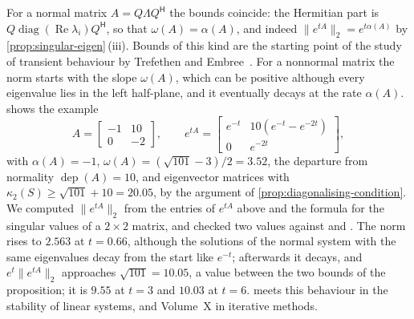 For a normal matrix $A=Q\Lambda Q^{\mathsf H}$ the bounds coincide: the Hermitian part is $Q\operatorname{diag}(\operatorname{Re}\lambda_i)Q^{\mathsf H}$, so that $\omega(A)=\alpha(A)$, and indeed $\|e^{tA}\|_2=e^{t\alpha(A)}$ by \cref{prop:singular-eigen}\,(iii). Bounds of this kind are the starting point of the study of transient behaviour by Trefethen and Embree~\cite{trefethen2005}. For a nonnormal matrix the norm starts with the slope $\omega(A)$, which can be positive although every eigenvalue lies in the left half-plane, and it eventually decays at the rate $\alpha(A)$.  shows the example
\[
A=\begin{bmatrix}-1&10\\0&-2\end{bmatrix},\qquad e^{tA}=\begin{bmatrix}e^{-t}&10(e^{-t}-e^{-2t})\\0&e^{-2t}\end{bmatrix},
\]
with $\alpha(A)=-1$, $\omega(A)=(\sqrt{101}-3)/2=3.52$, the departure from normality $\operatorname{dep}(A)=10$, and eigenvector matrices with $\kappa_2(S)\ge\sqrt{101}+10=20.05$, by the argument of \cref{prop:diagonalising-condition}. We computed $\|e^{tA}\|_2$ from the entries of $e^{tA}$ above and the formula for the singular values of a $2\times2$ matrix, and checked two values against  and . The norm rises to $2.563$ at $t=0.66$, although the solutions of the normal system with the same eigenvalues decay from the start like $e^{-t}$; afterwards it decays, and $e^t\|e^{tA}\|_2$ approaches $\sqrt{101}=10.05$, a value between the two bounds of the proposition; it is $9.55$ at $t=3$ and $10.03$ at $t=6$.  meets this behaviour in the stability of linear systems, and Volume~X in iterative methods.


